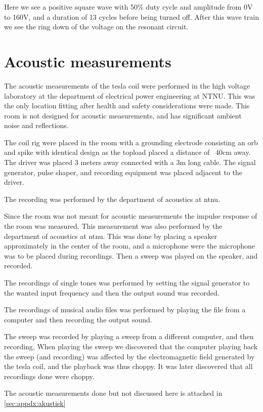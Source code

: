 Here we see a positive square wave with 50\% duty cycle and amplitude from 0V to 160V, and a duration of 13 cycles before being turned off. After this wave train we see the ring down of the voltage on the resonant circuit.

\newpage
\section{Acoustic measurements}

The acoustic measurements of the tesla coil were performed in the high voltage laboratory at the department of electrical power engineering at NTNU. This was the only location fitting after health and safety considerations were made. This room is not designed for acoustic measurements, and has significant ambient noise and reflections.

The coil rig were placed in the room with a grounding electrode consisting an orb and spike with identical design as the topload placed a distance of ~40cm away. The driver was placed 3 meters away connected with a 3m long cable. The signal generator, pulse shaper, and recording equipment was placed adjacent to the driver.

The recording was performed by the department of acoustics at ntnu.

Since the room was not meant for acoustic measurements the impulse response of the room was measured. This measurement was also performed by the department of acoustics at ntnu. This was done by placing a speaker approximately in the center of the room, and a microphone were the microphone was to be placed during recordings. Then a sweep was played on the speaker, and recorded.

The recordings of single tones was performed by setting the signal generator to the wanted input frequency and then the output sound was recorded.

The recordings of musical audio files was performed by playing the file from a computer and then recording the output sound.

The sweep was recorded by playing a sweep from a different computer, and then recording, When playing the sweep we discovered that the computer playing back the sweep (and recording) was affected by the electromagnetic field generated by the tesla coil, and the playback was thus choppy. It was later discovered that all recordings done were choppy.

The acoustic measurements done but not discussed here is attached in \cref{sec:appdx:akustisk}


